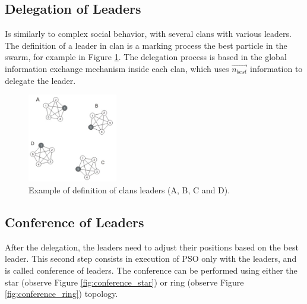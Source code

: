 \subsection{Delegation of Leaders}
Is similarly to complex social behavior, with several clans with various leaders. The definition of a leader in clan is a marking process the best particle in the swarm, for example in Figure \ref{fig:leaders}. The delegation process is based in the global information exchange mechanism inside each clan, which uses $\vec{n_{best}}$ information to delegate the leader.
\begin{figure}[!h]
\centering
 \includegraphics[width=0.35\textwidth]{image/Leaders}
 \caption{\small{Example of definition of clans leaders (A, B, C and D).}}
 \label{fig:leaders}
\end{figure}

\subsection{Conference of Leaders}
After the delegation, the leaders need to adjust their positions based on the best leader. This second step consists in execution of PSO only with the leaders, and is called conference of leaders. The conference can be performed using either the star (observe Figure \ref{fig:conference_star}) or ring (observe Figure \ref{fig:conference_ring}) topology.

